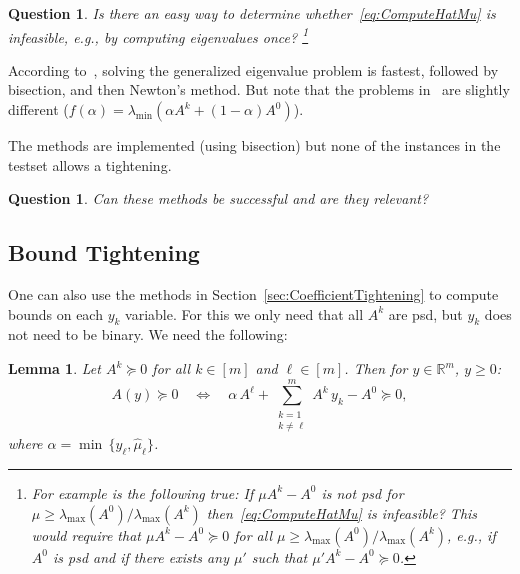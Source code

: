 \documentclass[10pt, a4paper]{article}
\newcommand{\R}{\mathds{R}}
\newtheorem{lemma}[theorem]{Lemma}
\newtheorem{question}[theorem]{Question}
\begin{document}
\begin{question}
  Is there an easy way to determine whether~\eqref{eq:ComputeHatMu} is
  infeasible, e.g., by computing eigenvalues once?  \footnote{For example
    is the following true: If $\mu A^k - A^0$ is not psd for
    $\mu \geq \lambda_{\max}(A^0)/\lambda_{\max}(A^k)$ then~\eqref{eq:ComputeHatMu} is
    infeasible? This would require that $\mu A^k - A^0 \succeq 0$ for all
    $\mu \geq \lambda_{\max}(A^0) / \lambda_{\max}(A^k)$, e.g., if $A^0$ is
    psd and if there exists any $\mu'$ such that $\mu' A^k - A^0 \succeq 0$.}
\end{question}

According to~\cite{Str16,HigSS16}, solving the generalized eigenvalue
problem is fastest, followed by bisection, and then Newton's method. But
note that the problems in~\cite{Str16,HigSS16} are slightly different
($f(\alpha) = \lambda_{\min}(\alpha A^k + (1 - \alpha) A^0)$).

The methods are implemented (using bisection) but none of the instances in
the testset allows a tightening.

\begin{question}
  Can these methods be successful and are they relevant?
\end{question}



\subsection{Bound Tightening}

One can also use the methods in Section~\ref{sec:CoefficientTightening} to
compute bounds on each $y_k$ variable. For this we only need that all $A^k$
are psd, but $y_k$ does not need to be binary. We need the following:

\begin{lemma}
  Let $A^k \succeq 0$ for all $k \in [m]$ and $\ell \in [m]$. Then for
  $y \in \R^m$, $y \geq 0$:
  \[
    A(y) \succeq 0 \quad\Leftrightarrow\quad
    \alpha\, A^{\ell} + \sum_{\substack{k=1\\k \neq \ell}}^m A^k\, y_k - A^0 \succeq 0,
  \]
  where $\alpha = \min\,\{y_{\ell},\hat{\mu}_{\ell}\}$.
\end{lemma}

\end{document}
